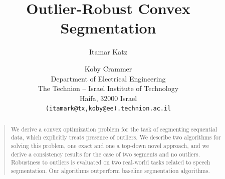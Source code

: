 \documentclass[letterpaper]{article}
\title{Outlier-Robust Convex Segmentation}
\author{
Itamar Katz \and Koby Crammer\\
Department of Electrical Engineering\\
The Technion -- Israel Institute of Technology\\
Haifa, 32000 Israel\\
\texttt{(itamark@tx,koby@ee).technion.ac.il}
}
\begin{document}
\maketitle
\begin{abstract}
\begin{quote}
We derive a convex optimization problem for the task of segmenting sequential data, which
explicitly treats presence of outliers.
We describe two algorithms for solving this
problem, one exact and one a top-down novel approach,
and we derive a consistency results for the case of two segments and no outliers.
Robustness to outliers is evaluated on
two real-world tasks related to speech segmentation.
Our algorithms outperform baseline segmentation algorithms.
\end{quote}
\end{abstract}










\clearpage %
\appendix

\end{document}
